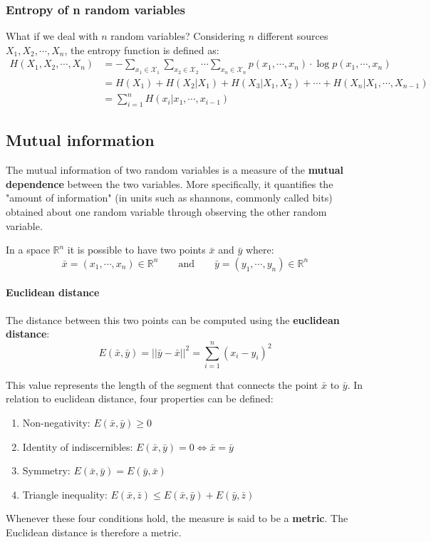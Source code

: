 \subsubsection{Entropy of n random variables} What if we deal with $n$ random variables? Considering $n$ different sources $X_1, X_2, \cdots, X_n$, the entropy function is defined as:
\begin{equation*}
\begin{split}
H(X_1, X_2, \cdots, X_n) &= -\sum_{x_1 \in \mathcal{X}_1} \sum_{x_2 \in \mathcal{X}_2} \cdots \sum_{x_n \in \mathcal{X}_n} p(x_1, \cdots, x_n) \cdot \log p(x_1, \cdots, x_n)\\
&=H(X_1) + H(X_2|X_1) + H(X_3| X_1, X_2) + \cdots + H(X_n | X_1, \cdots, X_{n-1})\\
&=\sum_{i=1}^n H(x_i| x_1, \cdots, x_{i-1})
\end{split}
\end{equation*}

\subsection{Mutual information}
The mutual information of two random variables is a measure of the \textbf{mutual dependence} between the two variables. More specifically, it quantifies the "amount of information" (in units such as shannons, commonly called bits) obtained about one random variable through observing the other random variable.

In a space $\mathbb{R}^n$ it is possible to have two points $\bar{x}$ and $\bar{y}$ where:
$$\bar{x} = (x_1, \cdots, x_n) \in \mathbb{R}^n \qquad \text{and} \qquad \bar{y} = (y_1, \cdots, y_n) \in \mathbb{R}^n$$


\paragraph{Euclidean distance} The distance between this two points can be computed using the \textbf{euclidean distance}:
$$E(\bar{x}, \bar{y}) = || \bar{y} - \bar{x}||^2 = \sum_{i=1}^n (x_i - y_i)^2$$


This value represents the length of the segment that connects the point $\bar{x}$ to $\bar{y}$. In relation to euclidean distance, four properties can be defined:
\begin{enumerate}
	\item Non-negativity: $E(\bar{x}, \bar{y}) \geq 0$
	\item Identity of indiscernibles: $E(\bar{x}, \bar{y}) = 0 \iff \bar{x} = \bar{y}$ 
	\item Symmetry: $E(\bar{x}, \bar{y}) = E(\bar{y}, \bar{x})$
	\item Triangle inequality: $E(\bar{x}, \bar{z}) \leq E(\bar{x}, \bar{y}) + E(\bar{y}, \bar{z})$
\end{enumerate}
Whenever these four conditions hold, the measure is said to be a \textbf{metric}. The Euclidean distance is therefore a metric.


